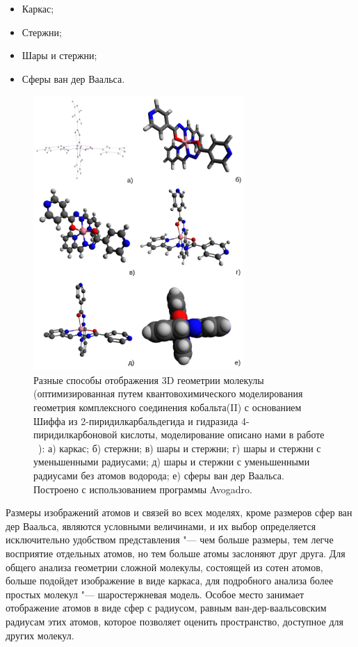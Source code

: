 \documentclass[10pt, a5paper]{article}
\begin{document}
\begin{itemize}
  \item Каркас;
  \item Стержни;
  \item Шары и стержни;
  \item Сферы ван дер Ваальса.
\end{itemize}

\begin{figure}[h!]
  \centering
  \includegraphics[width=8cm]{20_2016_Litvenenka3.png}
  \caption{Разные способы отображения 3D геометрии молекулы (оптимизированная путем квантовохимического моделирования геометрия комплексного соединения кобальта(II) с основанием Шиффа из 2-пиридилкарбальдегида и гидразида 4-пиридилкарбоновой кислоты, моделирование описано нами в работе ~\cite{Litvenenka2}): а) каркас; б) стержни; в) шары и стержни; г) шары и стержни с уменьшенными радиусами; д) шары и стержни с уменьшенными радиусами без атомов водорода; е) сферы ван дер Ваальса. Построено с использованием программы Avogadro.}
  \label{Litvenenka3}
\end{figure} 

Размеры изображений атомов и связей во всех моделях, кроме размеров сфер ван дер Ваальса, являются условными величинами, и их выбор определяется исключительно удобством представления "--- чем больше размеры, тем легче восприятие отдельных атомов, но тем больше атомы заслоняют друг друга. Для общего анализа геометрии сложной молекулы, состоящей из сотен атомов, больше подойдет изображение в виде каркаса, для подробного анализа более простых молекул "--- шаростержневая модель. Особое место занимает отображение атомов в виде сфер с радиусом, равным ван-дер-ваальсовским радиусам этих атомов, которое позволяет оценить пространство, доступное для других молекул.
\end{document}
